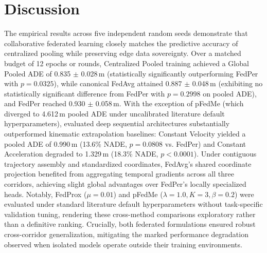 \documentclass[journal]{IEEEtran}
\begin{document}
\section{Discussion}
\label{sec:discussion}
The empirical results across five independent random seeds demonstrate that collaborative federated learning closely matches the predictive accuracy of centralized pooling while preserving edge data sovereignty. Over a matched budget of 12 epochs or rounds, Centralized Pooled training achieved a Global Pooled ADE of 0.835 $\pm$ 0.028\,m (statistically significantly outperforming FedPer with $p=0.0325$), while canonical FedAvg attained 0.887 $\pm$ 0.048\,m (exhibiting no statistically significant difference from FedPer with $p=0.2998$ on pooled ADE), and FedPer reached 0.930 $\pm$ 0.058\,m. With the exception of pFedMe (which diverged to 4.612\,m pooled ADE under uncalibrated literature default hyperparameters), evaluated deep sequential architectures substantially outperformed kinematic extrapolation baselines: Constant Velocity yielded a pooled ADE of 0.990\,m (13.6\% NADE, $p=0.0808$ vs. FedPer) and Constant Acceleration degraded to 1.329\,m (18.3\% NADE, $p < 0.0001$). Under contiguous trajectory assembly and standardized coordinates, FedAvg's shared coordinate projection benefited from aggregating temporal gradients across all three corridors, achieving slight global advantages over FedPer's locally specialized heads. Notably, FedProx ($\mu=0.01$) and pFedMe ($\lambda=1.0, K=3, \beta=0.2$) were evaluated under standard literature default hyperparameters without task-specific validation tuning, rendering these cross-method comparisons exploratory rather than a definitive ranking. Crucially, both federated formulations ensured robust cross-corridor generalization, mitigating the marked performance degradation observed when isolated models operate outside their training environments.
\end{document}
